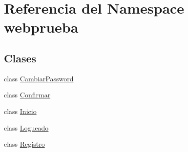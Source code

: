 \hypertarget{namespacewebprueba}{}\section{Referencia del Namespace webprueba}
\label{namespacewebprueba}
\subsection*{Clases}
\begin{DoxyCompactItemize}
\item 
class \mbox{\hyperlink{classwebprueba_1_1_cambiar_password}{Cambiar\+Password}}
\item 
class \mbox{\hyperlink{classwebprueba_1_1_confirmar}{Confirmar}}
\item 
class \mbox{\hyperlink{classwebprueba_1_1_inicio}{Inicio}}
\item 
class \mbox{\hyperlink{classwebprueba_1_1_logueado}{Logueado}}
\item 
class \mbox{\hyperlink{classwebprueba_1_1_registro}{Registro}}
\end{DoxyCompactItemize}
